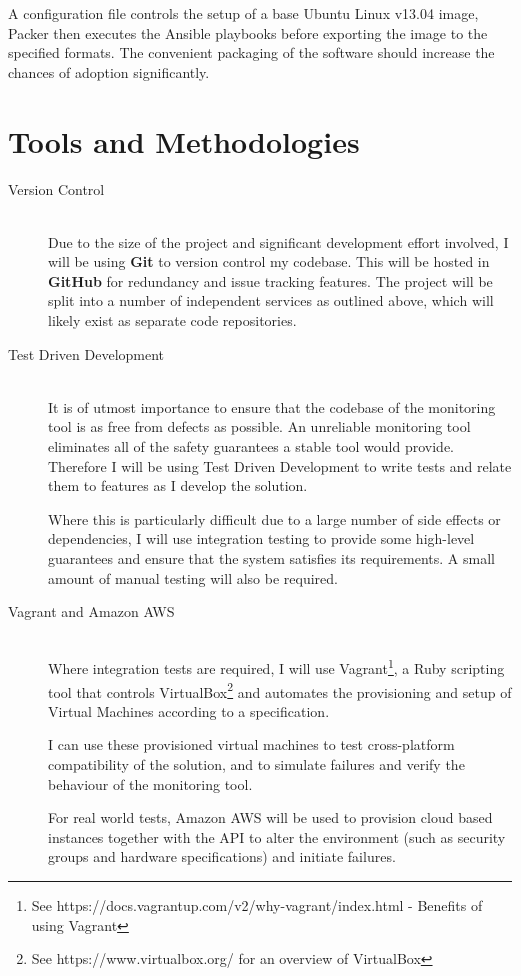 \documentclass{cshonours}
\begin{document}
A configuration file controls the setup of a base Ubuntu Linux v13.04 image, Packer then executes the Ansible playbooks before exporting the image to the specified formats. The convenient packaging of the software should increase the chances of adoption significantly.

\pagebreak
\section{Tools and Methodologies}
\begin{description}
  \item [Version Control]\hfill \\
    Due to the size of the project and significant development effort involved, I will be using \textbf{Git} to version control my codebase. This will be hosted in \textbf{GitHub} for redundancy and issue tracking features. The project will be split into a number of independent services as outlined above, which will likely exist as separate code repositories.
  \item [Test Driven Development]\hfill \\
    It is of utmost importance to ensure that the codebase of the monitoring tool is as free from defects as possible. An unreliable monitoring tool eliminates all of the safety guarantees a stable tool would provide. Therefore I will be using Test Driven Development to write tests and relate them to features as I develop the solution.

    Where this is particularly difficult due to a large number of side effects or dependencies, I will use integration testing to provide some high-level guarantees and ensure that the system satisfies its requirements. A small amount of manual testing will also be required.
  \item [Vagrant and Amazon AWS]\hfill \\
    Where integration tests are required, I will use Vagrant\footnote{See
    https://docs.vagrantup.com/v2/why-vagrant/index.html - Benefits of using Vagrant}, a Ruby scripting tool that controls
    VirtualBox\footnote{See https://www.virtualbox.org/ for an overview of VirtualBox} and automates the provisioning and setup of Virtual Machines according to a specification.

    I can use these provisioned virtual machines to test cross-platform compatibility of the solution, and to simulate failures and verify the behaviour of the monitoring tool.

    For real world tests, Amazon AWS will be used to provision cloud based instances together with the API to alter the environment (such as security groups and hardware specifications) and initiate failures.
\end{description}
\end{document}
